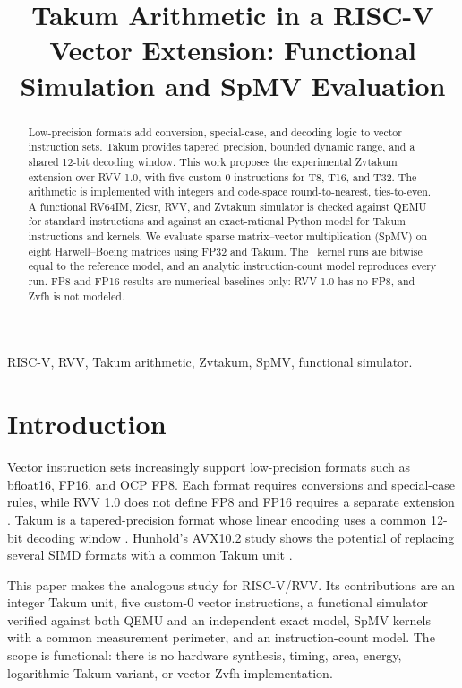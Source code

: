 \documentclass[conference]{IEEEtran}
\author{\IEEEauthorblockN{André Luís Alves Rezende, Gabriel Ramos Fontes\\
Isadora Maria Carvalho Lopes, João Pedro Santos de Brito}
\IEEEauthorblockA{Department of Electronic Engineering, Federal University of
Minas Gerais, Belo Horizonte, Brazil}}
\title{Takum Arithmetic in a RISC-V Vector Extension: Functional Simulation and SpMV Evaluation}
\begin{document}
\maketitle

\begin{abstract}
Low-precision formats add conversion, special-case, and decoding logic to vector
instruction sets. Takum provides tapered precision, bounded dynamic range, and
a shared 12-bit decoding window. This work proposes the experimental Zvtakum
extension over RVV 1.0, with five custom-0 instructions for T8, T16, and T32.
The arithmetic is implemented with integers and code-space round-to-nearest,
ties-to-even. A functional RV64IM, Zicsr, RVV, and Zvtakum simulator is checked
against QEMU for standard instructions and against an exact-rational Python
model for Takum instructions and kernels. We evaluate sparse matrix--vector
multiplication (SpMV) on eight Harwell--Boeing matrices using FP32 and Takum.
The \NumExecSpmv\ kernel runs are bitwise equal to the reference model, and an
analytic instruction-count model reproduces every run. FP8 and FP16 results
are numerical baselines only: RVV 1.0 has no FP8, and Zvfh is not modeled.
\end{abstract}

\begin{IEEEkeywords}
RISC-V, RVV, Takum arithmetic, Zvtakum, SpMV, functional simulator.
\end{IEEEkeywords}

\section{Introduction}
Vector instruction sets increasingly support low-precision formats such as
bfloat16, FP16, and OCP FP8. Each format requires conversions and special-case
rules, while RVV 1.0 does not define FP8 and FP16 requires a separate extension
\cite{riscv-v-spec,ofp8,bfloat16}. Takum is a tapered-precision format whose
linear encoding uses a common 12-bit decoding window \cite{hunhold2024takum}.
Hunhold's AVX10.2 study shows the potential of replacing several SIMD formats
with a common Takum unit \cite{hunhold2025avx102}.

This paper makes the analogous study for RISC-V/RVV. Its contributions are an
integer Takum unit, five custom-0 vector instructions, a functional simulator
verified against both QEMU and an independent exact model, SpMV kernels with a
common measurement perimeter, and an instruction-count model. The scope is
functional: there is no hardware synthesis, timing, area, energy, logarithmic
Takum variant, or vector Zvfh implementation.
\end{document}
